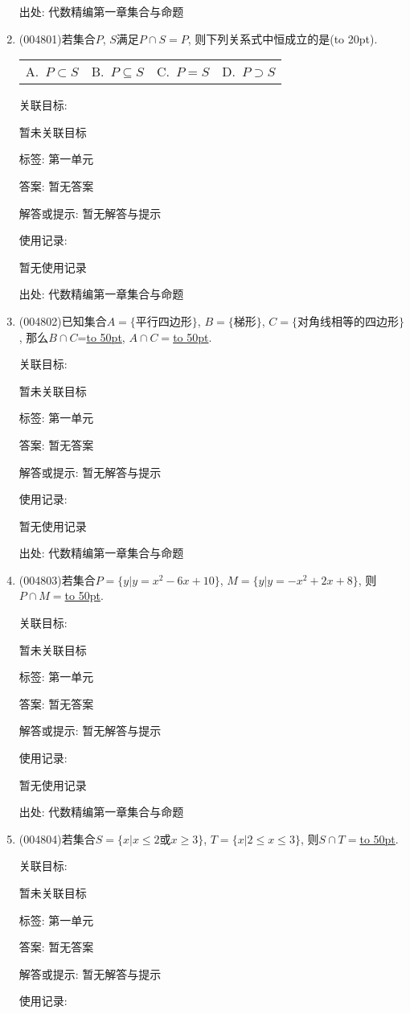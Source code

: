 \documentclass[10pt,a4paper]{article}
\newcommand{\blank}[1]{\underline{\hbox to #1pt{}}}
\newcommand{\bracket}[1]{(\hbox to #1pt{})}
\newcommand{\fourch}[4]{\par\begin{tabular}{p{.23\textwidth}p{.23\textwidth}p{.23\textwidth}p{.23\textwidth}}
A.~#1 &B.~#2& C.~#3& D.~#4
\end{tabular}}
\begin{document}
\begin{enumerate}[1.]
出处: 代数精编第一章集合与命题
\item { (004801)}若集合$P$, $S$满足$P\cap S=P$, 则下列关系式中恒成立的是\bracket{20}.
\fourch{$P\subset S$}{$P\subseteq S$}{$P=S$}{$P\supset S$}


关联目标:

暂未关联目标



标签: 第一单元

答案: 暂无答案

解答或提示: 暂无解答与提示

使用记录:

暂无使用记录


出处: 代数精编第一章集合与命题
\item { (004802)}已知集合$A=\{\text{平行四边形}\}$, $B=\{\text{梯形}\}$, $C=\{\text{对角线相等的四边形}\}$, 那么$B\cap C$=\blank{50}, $A\cap C=$\blank{50}.


关联目标:

暂未关联目标



标签: 第一单元

答案: 暂无答案

解答或提示: 暂无解答与提示

使用记录:

暂无使用记录


出处: 代数精编第一章集合与命题
\item { (004803)}若集合$P=\{y|y=x^2-6x+10\}$, $M=\{y|y=-x^2+2x+8\}$, 则$P\cap M=$\blank{50}.


关联目标:

暂未关联目标



标签: 第一单元

答案: 暂无答案

解答或提示: 暂无解答与提示

使用记录:

暂无使用记录


出处: 代数精编第一章集合与命题
\item { (004804)}若集合$S=\{x|x\le 2\text{或}x\ge 3\}$, $T=\{x|2\le x\le 3\}$, 则$S\cap T=$\blank{50}.


关联目标:

暂未关联目标



标签: 第一单元

答案: 暂无答案

解答或提示: 暂无解答与提示

使用记录:


\end{enumerate}
\end{document}
